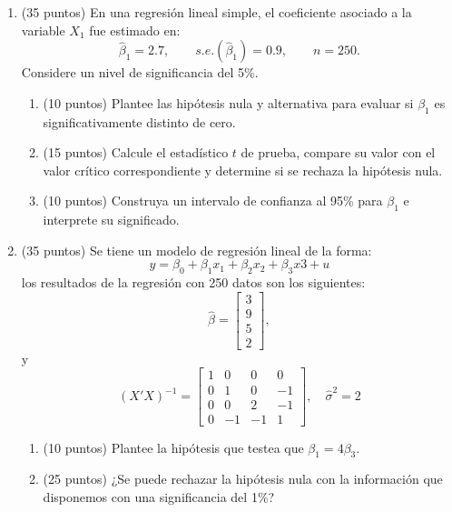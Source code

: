 \documentclass[10pt,a4paper]{article}
\begin{document}
 
\begin{enumerate}

    \item (35 puntos) En una regresión lineal simple, el coeficiente asociado a la variable
        \(X_1\) fue estimado en:
        \[
          \hat\beta_1 = 2.7,
          \qquad s.e.(\hat\beta_1) = 0.9,
          \qquad n = 250.
        \]
        Considere un nivel de significancia del 5\%.

        \begin{enumerate}[label=\alph*)]
          \item (10 puntos) Plantee las hipótesis nula y alternativa para evaluar si
                \( \beta_1 \) es significativamente distinto de cero.
          \item (15 puntos) Calcule el estadístico \( t \) de prueba, compare su valor
                con el valor crítico correspondiente y determine si se
                rechaza la hipótesis nula.
          \item (10 puntos) Construya un intervalo de confianza al 95\% para
                \( \beta_1 \) e interprete su significado.
        \end{enumerate}


\item (35 puntos) Se tiene un modelo de regresión lineal de la forma:
$$y=\beta_0 + \beta_1 x_1+\beta_2x_2+\beta_3 x3 + u$$
los resultados de la regresión con 250 datos son los siguientes:
        \[
          \hat{\beta} = \begin{bmatrix} 3 \\ 9 \\ 5 \\2 \end{bmatrix},
        \]
y 
        \[
          (X'X)^{-1} =
          \begin{bmatrix}
1 & 0  & 0  &  0\\
0 & 1  & 0  & -1\\
0 & 0  & 2  & -1\\
0 & -1 & -1 &  1
\end{bmatrix},
          \quad \hat{\sigma}^2 = 2
        \]
\begin{enumerate}
    \item (10 puntos) Plantee la hipótesis que testea que $\beta_1=4\beta_3$.

    \item (25 puntos) ¿Se puede rechazar la hipótesis nula con la información que disponemos con una significancia del 1\%? 
\end{enumerate}



\end{enumerate}
\end{document}
